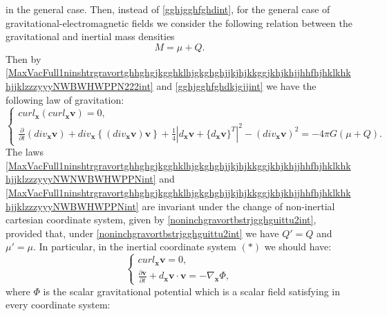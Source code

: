 \documentclass{article}
\theoremstyle{definition}
\theoremstyle{remark}
\renewcommand{\vec}[1]{\mathbf{#1}}
\newcommand{\er}{\eqref}
\newcommand{\er}{\eqref}
\begin{document}
in the general case. Then, instead of \er{gghjgghfghdint}, for the
general case of gravitational-electromagnetic fields we consider the
following relation between the gravitational and inertial mass
densities
\begin{equation}\label{gghjgghfghdkjgjjint}
M=\mu+Q.
\end{equation}
Then by
\er{MaxVacFull1ninshtrgravortghhghgjkgghklhjgkghghjjkjhjkkggjkhjkhjjhhfhjhklkhkhjjklzzzyyyNWBWHWPPN222int}
and \er{gghjgghfghdkjgjjint} we have the following law of
gravitation:
\begin{equation}
\label{MaxVacFull1ninshtrgravortghhghgjkgghklhjgkghghjjkjhjkkggjkhjkhjjhhfhjhklkhkhjjklzzzyyyNWBWHWPPNint}
\begin{cases}
curl_{\vec x}\left(curl_{\vec x}\vec v\right)= 0,\\
\frac{\partial}{\partial t}\left(div_{\vec x}\vec v\right)+div_{\vec
x}\left\{\left(div_{\vec x}\vec v\right)\vec
v\right\}+\frac{1}{4}\left|d_{\vec x}\vec v+\{d_{\vec x}\vec
v\}^T\right|^2-\left(div_{\vec x}\vec v\right)^2=  -4\pi G(\mu+Q).
\end{cases}
\end{equation}
The laws
\er{MaxVacFull1ninshtrgravortghhghgjkgghklhjgkghghjjkjhjkkggjkhjkhjjhhfhjhklkhkhjjklzzzyyyNWNWBWHWPPNint}
and
\er{MaxVacFull1ninshtrgravortghhghgjkgghklhjgkghghjjkjhjkkggjkhjkhjjhhfhjhklkhkhjjklzzzyyyNWBWHWPPNint}
are invariant under the change of non-inertial cartesian coordinate
system, given by \er{noninchgravortbstrjgghguittu2int}, provided
that, under \er{noninchgravortbstrjgghguittu2int} we have $Q'=Q$ and
$\mu'=\mu$. In particular, in the inertial coordinate system $(*)$
we should have:
\begin{equation}
\label{MaxVacFull1ninshtrgravortghhghgjkgghklhjgkghghjjkjhjkkggjkhjkhjjhhfhjhklkhkhjjklzzzyyyhjggjhgghhjhNWNWBWHWPPNint}
\begin{cases}
curl_{\vec x}\vec v= 0,\\
\frac{\partial\vec v}{\partial t}+d_\vec x\vec v\cdot\vec v=
-\nabla_{\vec x}\Phi,
\end{cases}
\end{equation}
where $\Phi$ is the scalar gravitational potential which is a scalar
field satisfying in every coordinate system:
\end{document}
